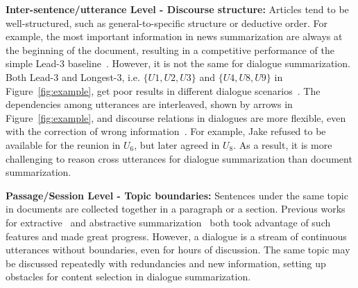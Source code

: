 \textbf{Inter-sentence/utterance Level - Discourse structure:}
Articles tend to be well-structured, such as 
general-to-specific structure or deductive order. 
For example, the most important information 
in news summarization are always at the beginning of the document, resulting in a competitive performance of the simple Lead-$3$ baseline~\cite{nallapati2017, see2017get}. However, it is not the same for dialogue summarization. Both Lead-$3$ and Longest-$3$, i.e. $\{U1, U2, U3\}$ and $\{U4, U8, U9\}$ in Figure~\ref{fig:example}, get poor results in different dialogue scenarios~\cite{gliwa2019samsum,chen2021dialsumm,zhang2021emailsum}.
The dependencies among utterances are interleaved, shown by arrows in Figure~\ref{fig:example}, and discourse relations in dialogues are more flexible,
even with the correction of wrong information~\cite{asher2016discourse}. 
For example, 
Jake refused to be available for the reunion in $U_6$, but later agreed
in $U_8$.  As a result, it is more challenging to reason cross utterances for 
dialogue summarization than document summarization.

\textbf{Passage/Session Level - Topic boundaries:} Sentences under the same topic in documents are collected together in a paragraph or a section.
Previous works for extractive~\cite{xiao2019extractive} and abstractive summarization~\cite{cohan2018discourse} both took advantage of such features and made great progress. 
However, a dialogue is a stream of continuous 
utterances without boundaries, even for hours of discussion. The same topic may be discussed repeatedly 
with redundancies and new information, setting up obstacles for content 
selection in dialogue summarization.

